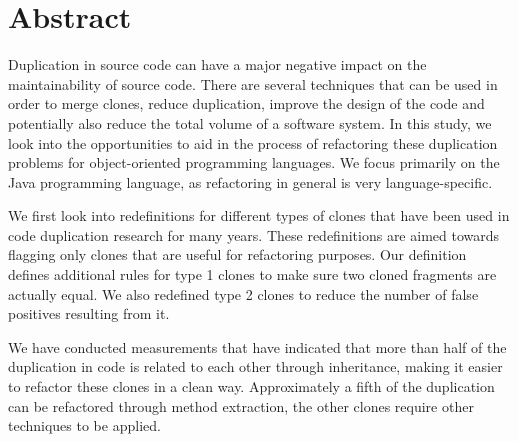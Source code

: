 \chapter*{Abstract}

Duplication in source code can have a major negative impact on the maintainability of source code. There are several techniques that can be used in order to merge clones, reduce duplication, improve the design of the code and potentially also reduce the total volume of a software system. In this study, we look into the opportunities to aid in the process of refactoring these duplication problems for object-oriented programming languages. We focus primarily on the Java programming language, as refactoring in general is very language-specific.

We first look into redefinitions for different types of clones that have been used in code duplication research for many years. These redefinitions are aimed towards flagging only clones that are useful for refactoring purposes. Our definition defines additional rules for type 1 clones to make sure two cloned fragments are actually equal. We also redefined type 2 clones to reduce the number of false positives resulting from it.

We have conducted measurements that have indicated that more than half of the duplication in code is related to each other through inheritance, making it easier to refactor these clones in a clean way. Approximately a fifth of the duplication can be refactored through method extraction, the other clones require other techniques to be applied.
